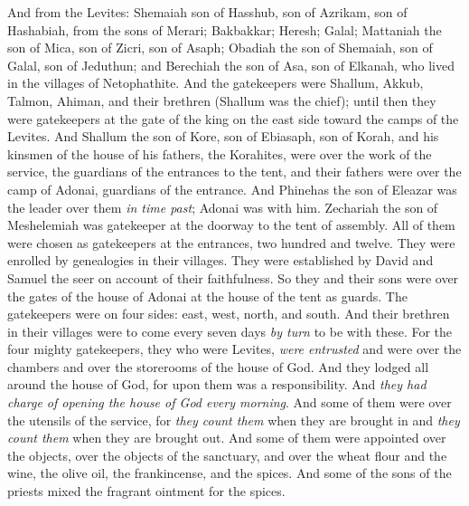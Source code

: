 \begin{biblechapter}
\verse And from the Levites: Shemaiah son of Hasshub, son of Azrikam, son of Hashabiah, from the sons of Merari;
\verse Bakbakkar; Heresh; Galal; Mattaniah the son of Mica, son of Zicri, son of Asaph;
\verse Obadiah the son of Shemaiah, son of Galal, son of Jeduthun; and Berechiah the son of Asa, son of Elkanah, who lived in the villages of Netophathite.
\verse And the gatekeepers were Shallum, Akkub, Talmon, Ahiman, and their brethren (Shallum was the chief);
\verse until then they were gatekeepers at the gate of the king on the east side toward the camps of the Levites.
\verse And Shallum the son of Kore, son of Ebiasaph, son of Korah, and his kinsmen of the house of his fathers, the Korahites, were over the work of the service, the guardians of the entrances to the tent, and their fathers were over the camp of Adonai, guardians of the entrance.
\verse And Phinehas the son of Eleazar was the leader over them \textit{in time past}; Adonai was with him.
\verse Zechariah the son of Meshelemiah was gatekeeper at the doorway to the tent of assembly.
\verse All of them were chosen as gatekeepers at the entrances, two hundred and twelve. They were enrolled by genealogies in their villages. They were established by David and Samuel the seer on account of their faithfulness.
\verse So they and their sons were over the gates of the house of Adonai at the house of the tent as guards.
\verse The gatekeepers were on four sides: east, west, north, and south.
\verse And their brethren in their villages were to come every seven days \textit{by turn} to be with these.
\verse For the four mighty gatekeepers, they who were Levites, \textit{were entrusted} and were over the chambers and over the storerooms of the house of God.
\verse And they lodged all around the house of God, for upon them was a responsibility. And \textit{they had charge of opening the house of God every morning}.
\verse And some of them were over the utensils of the service, for \textit{they count them} when they are brought in and \textit{they count them} when they are brought out.
\verse And some of them were appointed over the objects, over the objects of the sanctuary, and over the wheat flour and the wine, the olive oil, the frankincense, and the spices.
\verse And some of the sons of the priests mixed the fragrant ointment for the spices.

\end{biblechapter}

